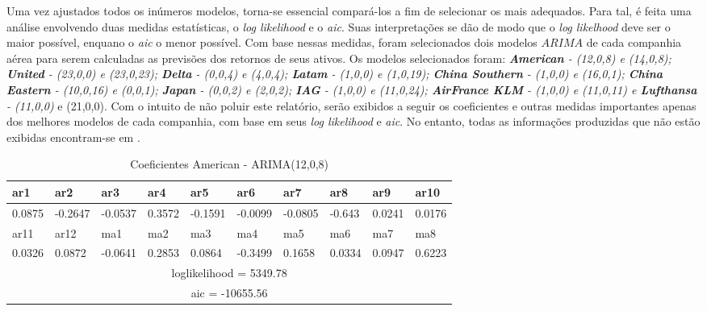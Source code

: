 \documentclass[12pt]{article}
\begin{document}
Uma vez ajustados todos os inúmeros modelos, torna-se essencial compará-los a fim de selecionar os mais adequados. Para tal, é feita uma análise envolvendo duas medidas estatísticas, o \textit{log likelihood} e o \textit{aic}. Suas interpretações se dão de modo que o \textit{log likelhood} deve ser o maior possível, enquano o \textit{aic} o menor possível. Com base nessas medidas, foram selecionados dois modelos $ARIMA$ de cada companhia aérea para serem calculadas as previsões dos retornos de seus ativos. Os modelos selecionados foram: \emph{\textbf{American} - (12,0,8) e (14,0,8); \textbf{United} - (23,0,0) e (23,0,23); \textbf{Delta} - (0,0,4) e (4,0,4); \textbf{Latam} - (1,0,0) e (1,0,19); \textbf{China Southern} - (1,0,0) e (16,0,1); \textbf{China Eastern} - (10,0,16) e (0,0,1); \textbf{Japan} - (0,0,2) e (2,0,2); \textbf{IAG} - (1,0,0) e (11,0,24); \textbf{AirFrance KLM} - (1,0,0) e (11,0,11) e \textbf{Lufthansa} - (11,0,0)} e (21,0,0). Com o intuito de não poluir este relatório, serão exibidos a seguir os coeficientes e outras medidas importantes apenas dos melhores modelos de cada companhia, com base em seus \textit{log likelihood} e \textit{aic}. No entanto, todas as informações produzidas que não estão exibidas encontram-se em \cite{git}.

\begin{table}[H]
\centering
\begin{tabular}{|l|l|l|l|l|l|l|l|l|l|}
\hline
ar1    & ar2     & ar3     & ar4    & ar5     & ar6     & ar7     & ar8    & ar9    & ar10   \\ \hline
0.0875 & -0.2647 & -0.0537 & 0.3572 & -0.1591 & -0.0099 & -0.0805 & -0.643 & 0.0241 & 0.0176 \\ \hline
ar11   & ar12    & ma1     & ma2    & ma3     & ma4     & ma5     & ma6    & ma7    & ma8    \\ \hline
0.0326 & 0.0872  & -0.0641 & 0.2853 & 0.0864  & -0.3499 & 0.1658  & 0.0334 & 0.0947 & 0.6223 \\ \hline
\multicolumn{10}{|c|}{loglikelihood = 5349.78}                                               \\ \hline
\multicolumn{10}{|c|}{aic = -10655.56}                                                       \\ \hline 
\end{tabular}
\caption{Coeficientes American - ARIMA(12,0,8)}
\label{tab:American1208}
\end{table}
\end{document}

